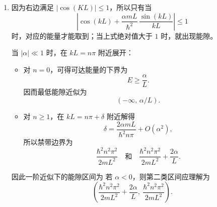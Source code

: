 \begin{question}
\begin{solution}
\begin{enumerate}[label=(\arabic*),leftmargin=2.5em]
  \item 因为右边满足 $|\cos(KL)|\le 1$，所以只有当
  \[
  \left|\cos(kL)+\frac{\alpha mL}{\hbar^2}\,\frac{\sin(kL)}{kL}\right|\le 1
  \]
  时，对应的能量才能取到；当上式绝对值大于 $1$ 时，就出现能隙。

  当 $|\alpha|\ll 1$ 时，在 $kL=n\pi$ 附近展开：

  \begin{itemize}[leftmargin=2em]
    \item 对 $n=0$，可得可达能量的下界为
    \[
    E\ge \frac{\alpha}{L}.
    \]
    因而最低能隙近似为
    \[
    (-\infty,\,\alpha/L).
    \]

    \item 对 $n\ge 1$，在 $kL=n\pi+\delta$ 附近解得
    \[
    \delta=\frac{2\alpha mL}{\hbar^2 n\pi}+O(\alpha^2),
    \]
    所以禁带边界为
    \[
    \frac{\hbar^2 n^2\pi^2}{2mL^2}
    \quad\text{和}\quad
    \frac{\hbar^2 n^2\pi^2}{2mL^2}+\frac{2\alpha}{L}.
    \]
  \end{itemize}

  因此一阶近似下的能隙区间为
  若 $\alpha<0$，则第二类区间应理解为
  \[
  \left(\frac{\hbar^2 n^2\pi^2}{2mL^2}+\frac{2\alpha}{L},\ \frac{\hbar^2 n^2\pi^2}{2mL^2}\right).
  \]
\end{enumerate}
\end{solution}
\end{question}

